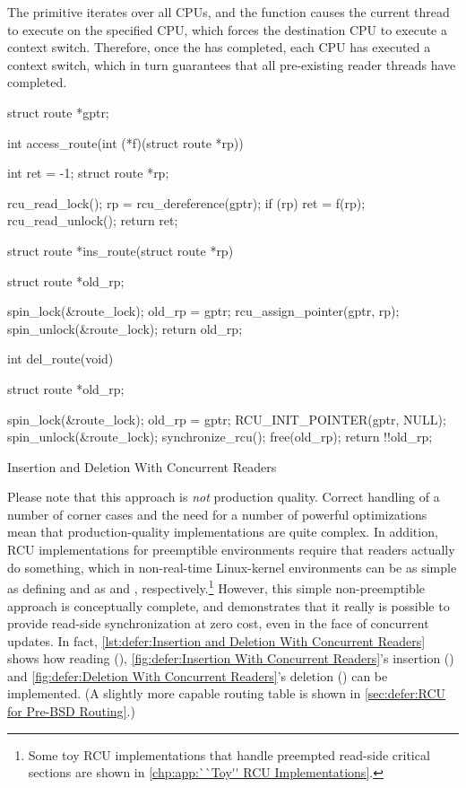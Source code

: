 The  primitive iterates over all CPUs, and
the  function causes the current thread to
execute on the specified CPU, which forces the destination CPU to execute
a context switch.
Therefore, once the  has completed, each CPU
has executed a context switch, which in turn guarantees that
all pre-existing reader threads have completed.

\begin{listing}
\begin{fcvlabel}
\begin{VerbatimL}[commandchars=\\\[\]]
struct route *gptr;

int access_route(int (*f)(struct route *rp))
{
	int ret = -1;
	struct route *rp;

	rcu_read_lock();
	rp = rcu_dereference(gptr);
	if (rp)
		ret = f(rp);		\lnlbl[access_rp]
	rcu_read_unlock();
	return ret;
}

struct route *ins_route(struct route *rp)
{
	struct route *old_rp;

	spin_lock(&route_lock);
	old_rp = gptr;
	rcu_assign_pointer(gptr, rp);
	spin_unlock(&route_lock);
	return old_rp;
}

int del_route(void)
{
	struct route *old_rp;

	spin_lock(&route_lock);
	old_rp = gptr;
	RCU_INIT_POINTER(gptr, NULL);
	spin_unlock(&route_lock);
	synchronize_rcu();
	free(old_rp);
	return !!old_rp;
}
\end{VerbatimL}
\end{fcvlabel}
\caption{Insertion and Deletion With Concurrent Readers}
\label{lst:defer:Insertion and Deletion With Concurrent Readers}
\end{listing}

Please note that this approach is \emph{not} production quality.
Correct handling of a number of corner cases and the need for a number
of powerful optimizations mean that production-quality implementations
are quite complex.
In addition, RCU implementations for preemptible environments
require that readers actually do something, which in non-real-time
Linux-kernel environments can be as simple as defining
 and  as 
and , respectively.\footnote{
	Some toy RCU implementations that handle preempted
	read-side critical sections are shown in
	\cref{chp:app:``Toy'' RCU Implementations}.}
However, this simple non-preemptible approach is conceptually complete,
and demonstrates that it really is possible to provide read-side
synchronization at zero cost, even in the face of concurrent updates.
In fact,
\cref{lst:defer:Insertion and Deletion With Concurrent Readers}
shows how reading (),
\cref{fig:defer:Insertion With Concurrent Readers}'s
insertion () and
\cref{fig:defer:Deletion With Concurrent Readers}'s
deletion () can
be implemented.
(A slightly more capable routing table is shown in
\cref{sec:defer:RCU for Pre-BSD Routing}.)

